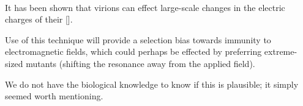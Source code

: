\documentclass[fleqn,10pt]{article}
\begin{document}
\clearpage
\paragraph{}

It has been shown that virions can effect large-scale changes in the electric charges of their []. 

Use of this technique will provide a selection bias towards immunity to electromagnetic fields, which could perhaps be effected by preferring extreme-sized mutants (shifting the resonance away from the applied field). 

We do not have the biological knowledge to know if this is plausible; it simply seemed worth mentioning. 












\nocite{*}

\printbibliography[ title={All references}]
\end{document}
